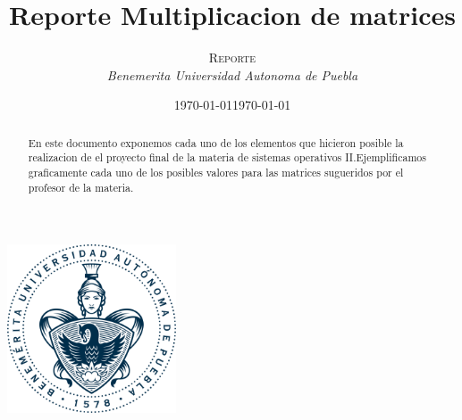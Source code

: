 \documentclass[12pt]{article}
\makeatletter
\renewcommand{\maketitle}{ %
\begin{flushright} %
{\LARGE\@title} %

\vspace{50pt} %

{\large\@author} %
\\\@date %

\vspace{40pt} %
\end{flushright}
}
\makeatother
\begin{document}
\begin{titlepage}
\begin{center}
\date{\today} %


\includegraphics[width=5cm,height=5cm,keepaspectratio]{buap.png}\newpage%

\end{center}

\title{\centering Reporte Multiplicacion de matrices}


\author{\textsc{Reporte} %
\\{\textit{Benemerita Universidad Autonoma de Puebla}}} %

\date{\today} %



\maketitle %



\begin{abstract}
En este documento exponemos cada uno de los elementos que hicieron posible la realizacion de el proyecto final de la materia de sistemas operativos II.Ejemplificamos graficamente cada uno de los posibles valores para las matrices sugueridos por el profesor de la materia.
\end{abstract}



\end{titlepage}
\end{document}
